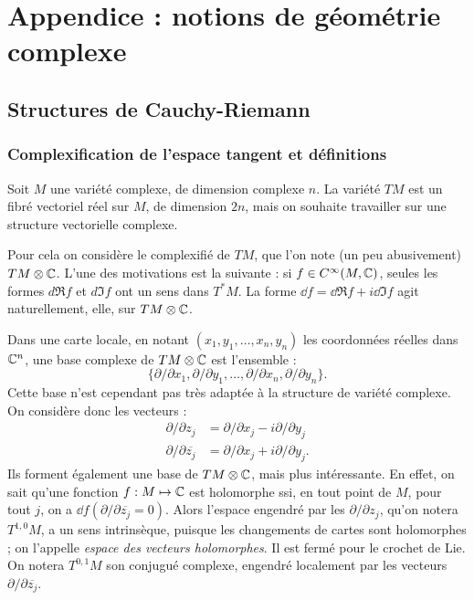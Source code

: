 
\chapter{Appendice : notions de géométrie complexe}
\section{Structures de Cauchy-Riemann}
\subsection{Complexification de l'espace tangent et définitions}
Soit $M$ une variété complexe, de dimension complexe $n$. La variété $TM$ est un fibré vectoriel réel sur $M$, de dimension $2n$, mais on souhaite travailler sur une structure vectorielle complexe.

Pour cela on considère le complexifié de $TM$, que l'on note (un peu abusivement) $TM \otimes \mathbb{C}$. L'une des motivations est la suivante : si $f \in C^{\infty}(M,\mathbb{C})$, seules les formes $d\Re f$ et $d\Im f$ ont un sens dans $T^*M$. La forme $\dd f = \dd \Re f + i \dd \Im f$ agit naturellement, elle, sur $TM \otimes \mathbb{C}$.

Dans une carte locale, en notant $(x_1,y_1,\ldots, x_n,y_n)$ les coordonnées réelles dans $\mathbb{C}^n$, une base complexe de $TM \otimes \mathbb{C}$ est l'ensemble :
\begin{equation*}
	\{\partial/\partial x_1,\partial/\partial y_1, \ldots, \partial/\partial x_n, \partial/\partial y_n \}.
\end{equation*}
Cette base n'est cependant pas très adaptée à la structure de variété complexe. On considère donc les vecteurs :
\begin{align*}
	\partial/\partial z_j &= \partial/\partial x_j - i \partial/\partial y_j\\
	\partial/\partial \overline{z_j} &= \partial/\partial x_j + i \partial/\partial y_j.
\end{align*}
Ils forment également une base de $TM \otimes \mathbb{C}$, mais plus intéressante. En effet, on sait qu'une fonction $f : M \mapsto \mathbb{C}$ est holomorphe ssi, en tout point de $M$, pour tout $j$, on a $\dd f(\partial/\partial \overline{z_j}=0)$. Alors l'espace engendré par les $\partial/\partial z_j$, qu'on notera $T^{1,0}M$, a un sens intrinsèque, puisque les changements de cartes sont holomorphes ; on l'appelle \emph{espace des vecteurs holomorphes}. Il est fermé pour le crochet de Lie. On notera $T^{0,1}M$ son conjugué complexe, engendré localement par les vecteurs $\partial/\partial \overline{z_j}$.

